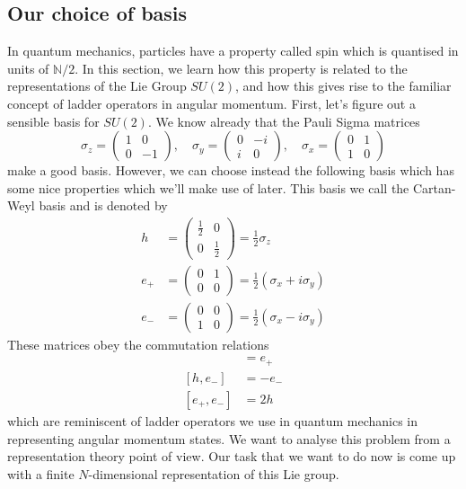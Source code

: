\documentclass[11pt, oneside]{article}   	%
\theoremstyle{slanted}
\begin{document}
\subsection{Our choice of basis}  
In quantum mechanics, particles have a property called spin which is quantised in units of $\mathbb{ N} / 2 $. In this section, we learn how this property is related to the representations of the Lie Group $SU(2)$, and how this gives rise to the familiar concept of ladder operators in angular momentum. First, let's figure out a sensible basis for $SU(2)$. We know already that the Pauli Sigma matrices \[ 
\sigma_z = \begin{pmatrix} 1 & 0 \\ 0 & - 1 \end{pmatrix}, \quad \sigma_y  = \begin{pmatrix} 0 & -i \\ i & 0 \end{pmatrix}, \quad \sigma_x =  \begin{pmatrix} 0  & 1 \\ 1 & 0 \end{pmatrix} \]   
make a good basis. However, we can choose instead the following basis which has some nice properties which we'll make use of later. This basis we call the Cartan-Weyl basis and is denoted by 
\begin{align*}
h & = \begin{pmatrix} \frac{ 1} {2} & 0 \\ 0 & \frac{1}{2} \end{pmatrix} = \frac{1}{2} \sigma_z  \\ 
e_+ &= \begin{pmatrix} 0 & 1 \\ 0 & 0 \end{pmatrix} = \frac{1}{2} ( \sigma_x + i \sigma_y )  \\ 
e_- &= \begin{pmatrix} 0 & 0 \\ 1 & 0 \end{pmatrix} = \frac{1}{2} ( \sigma_x - i \sigma_y)  
\end{align*} 
These matrices obey the commutation relations \begin{align*} [h, e_+ ] & = e_+ \\ 
[h, e_- ] & = - e_- \\ 
[e_+, e_- ] &= 2 h 
\end{align*} which are reminiscent of ladder operators we use in quantum mechanics in representing angular momentum states. We want to analyse this problem from a representation theory point of view. Our task that we want to do now is come up with a finite $N$-dimensional representation of this Lie group. 
\end{document}
